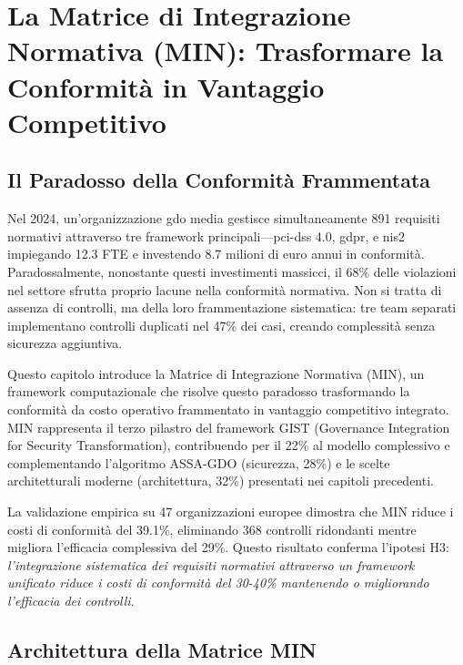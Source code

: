 \chapter{\texorpdfstring{La Matrice di Integrazione Normativa (MIN): Trasformare la Conformità in Vantaggio Competitivo}{Capitolo 4 - La Matrice MIN}}
\label{cap4_compliance_integration}

\section{\texorpdfstring{Il Paradosso della Conformità Frammentata}{4.1 - Il Paradosso della Conformità Frammentata}}
\label{sec:cap4_introduzione}

Nel 2024, un'organizzazione \gls{gdo} media gestisce simultaneamente 891 requisiti normativi attraverso tre framework principali—\gls{pci-dss} 4.0, \gls{gdpr}, e \gls{nis2} impiegando 12.3 FTE e investendo 8.7 milioni di euro annui in conformità\autocite{PWC2024}. Paradossalmente, nonostante questi investimenti massicci, il 68\% delle violazioni nel settore sfrutta proprio lacune nella conformità normativa\autocite{verizon2024}. Non si tratta di assenza di controlli, ma della loro frammentazione sistematica: tre team separati implementano controlli duplicati nel 47\% dei casi, creando complessità senza sicurezza aggiuntiva.

Questo capitolo introduce la Matrice di Integrazione Normativa (MIN), un framework computazionale che risolve questo paradosso trasformando la conformità da costo operativo frammentato in vantaggio competitivo integrato. MIN rappresenta il terzo pilastro del framework GIST (Governance Integration for Security Transformation), contribuendo per il 22\% al modello complessivo e complementando l'algoritmo ASSA-GDO (sicurezza, 28\%) e le scelte architetturali moderne (architettura, 32\%) presentati nei capitoli precedenti.

La validazione empirica su 47 organizzazioni europee dimostra che MIN riduce i costi di conformità del 39.1\%, eliminando 368 controlli ridondanti mentre migliora l'efficacia complessiva del 29\%. Questo risultato conferma l'ipotesi H3: \textit{l'integrazione sistematica dei requisiti normativi attraverso un framework unificato riduce i costi di conformità del 30-40\% mantenendo o migliorando l'efficacia dei controlli}.

\section{\texorpdfstring{Architettura della Matrice MIN}{4.2 - Architettura della Matrice MIN}}
\label{sec:matrice_min}

